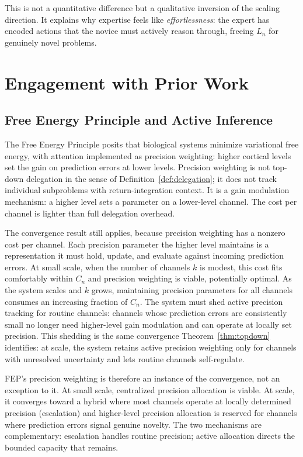 \documentclass[11pt]{article}
\theoremstyle{definition}
\begin{document}
This is not a quantitative difference but a qualitative inversion of
the scaling direction. It explains why expertise feels like
\emph{effortlessness}: the expert has encoded actions that the novice
must actively reason through, freeing $L_n$ for genuinely novel
problems.

\section{Engagement with Prior Work}
\label{sec:prior}

\subsection{Free Energy Principle and Active Inference}

The Free Energy Principle \cite{Friston2010,Friston2017} posits that
biological systems minimize variational free energy, with attention
implemented as precision weighting: higher cortical levels set the gain
on prediction errors at lower levels. Precision weighting is not
top-down delegation in the sense of Definition~\ref{def:delegation}; it
does not track individual subproblems with return-integration context.
It is a gain modulation mechanism: a higher level sets a parameter on a
lower-level channel. The cost per channel is lighter than full
delegation overhead.

The convergence result still applies, because precision weighting has
a nonzero cost per channel. Each precision parameter the higher level
maintains is a representation it must hold, update, and evaluate against
incoming prediction errors. At small scale, when the number of
channels $k$ is modest, this cost fits comfortably within $C_n$ and
precision weighting is viable, potentially optimal. As the system
scales and $k$ grows, maintaining precision parameters for all channels
consumes an increasing fraction of $C_n$. The system must shed active
precision tracking for routine channels: channels whose prediction
errors are consistently small no longer need higher-level gain
modulation and can operate at locally set precision. This shedding is
the same convergence Theorem~\ref{thm:topdown} identifies: at scale,
the system retains active precision weighting only for channels with
unresolved uncertainty and lets routine channels self-regulate.

FEP's precision weighting is therefore an instance of the convergence,
not an exception to it. At small scale, centralized precision
allocation is viable. At scale, it converges toward a hybrid where
most channels operate at locally determined precision (escalation) and
higher-level precision allocation is reserved for channels where
prediction errors signal genuine novelty. The two mechanisms are
complementary: escalation handles routine precision; active allocation
directs the bounded capacity that remains.
\end{document}
